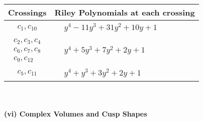 \documentclass[1p]{elsarticle_modified}
\theoremstyle{definition}
\begin{document}
\begin{tabular}{m{50pt}|m{274pt}}
Crossings & \hspace{64pt}Riley Polynomials at each crossing \\
\hline $$\begin{aligned}c_{1},c_{10}\end{aligned}$$&$\begin{aligned}
&y^4-11 y^3+31 y^2+10 y+1
\end{aligned}$\\
\hline $$\begin{aligned}c_{2},c_{3},c_{4}\\c_{6},c_{7},c_{8}\\c_{9},c_{12}\end{aligned}$$&$\begin{aligned}
&y^4+5 y^3+7 y^2+2 y+1
\end{aligned}$\\
\hline $$\begin{aligned}c_{5},c_{11}\end{aligned}$$&$\begin{aligned}
&y^4+y^3+3 y^2+2 y+1
\end{aligned}$\\
\hline
\end{tabular}\\~\\
\newpage\flushleft \textbf{(vi) Complex Volumes and Cusp Shapes}
\end{document}
